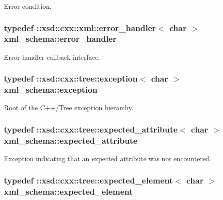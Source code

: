 Error condition. 

\hypertarget{namespacexml__schema_abdee01986b8e16f04af47dd12038261e}{
\subsubsection[{error\-\_\-handler}]{\setlength{\rightskip}{0pt plus 5cm}typedef \-::xsd\-::cxx\-::xml\-::error\-\_\-handler$<$ char $>$ {\bf xml\-\_\-schema\-::error\-\_\-handler}}}\label{namespacexml__schema_abdee01986b8e16f04af47dd12038261e}


Error handler callback interface. 

\hypertarget{namespacexml__schema_a7eb0fa6af3de36ea17011d26a731b62b}{
\subsubsection[{exception}]{\setlength{\rightskip}{0pt plus 5cm}typedef \-::xsd\-::cxx\-::tree\-::exception$<$ char $>$ {\bf xml\-\_\-schema\-::exception}}}\label{namespacexml__schema_a7eb0fa6af3de36ea17011d26a731b62b}


Root of the C++/\-Tree exception hierarchy. 

\hypertarget{namespacexml__schema_ad8a9d3a09372da61ab6ba78c4de87a26}{
\subsubsection[{expected\-\_\-attribute}]{\setlength{\rightskip}{0pt plus 5cm}typedef \-::xsd\-::cxx\-::tree\-::expected\-\_\-attribute$<$ char $>$ {\bf xml\-\_\-schema\-::expected\-\_\-attribute}}}\label{namespacexml__schema_ad8a9d3a09372da61ab6ba78c4de87a26}


Exception indicating that an expected attribute was not encountered. 

\hypertarget{namespacexml__schema_a4b608c951db27c574552da0bda062e1a}{
\subsubsection[{expected\-\_\-element}]{\setlength{\rightskip}{0pt plus 5cm}typedef \-::xsd\-::cxx\-::tree\-::expected\-\_\-element$<$ char $>$ {\bf xml\-\_\-schema\-::expected\-\_\-element}}}\label{namespacexml__schema_a4b608c951db27c574552da0bda062e1a}


